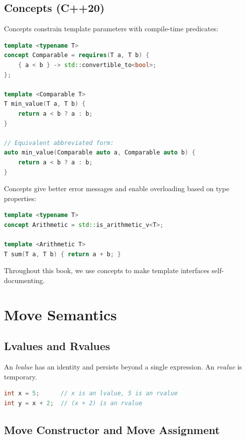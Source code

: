 \subsection{Concepts (C++20)}

Concepts constrain template parameters with compile-time predicates:

\begin{lstlisting}[language=C++]
template <typename T>
concept Comparable = requires(T a, T b) {
    { a < b } -> std::convertible_to<bool>;
};

template <Comparable T>
T min_value(T a, T b) {
    return a < b ? a : b;
}

// Equivalent abbreviated form:
auto min_value(Comparable auto a, Comparable auto b) {
    return a < b ? a : b;
}
\end{lstlisting}

Concepts give better error messages and enable overloading based on type properties:

\begin{lstlisting}[language=C++]
template <typename T>
concept Arithmetic = std::is_arithmetic_v<T>;

template <Arithmetic T>
T sum(T a, T b) { return a + b; }
\end{lstlisting}

Throughout this book, we use concepts to make template interfaces self-documenting.

\section{Move Semantics}

\subsection{Lvalues and Rvalues}

An \textit{lvalue} has an identity and persists beyond a single expression. An \textit{rvalue} is temporary.

\begin{lstlisting}[language=C++]
int x = 5;      // x is an lvalue, 5 is an rvalue
int y = x + 2;  // (x + 2) is an rvalue
\end{lstlisting}

\subsection{Move Constructor and Move Assignment}

